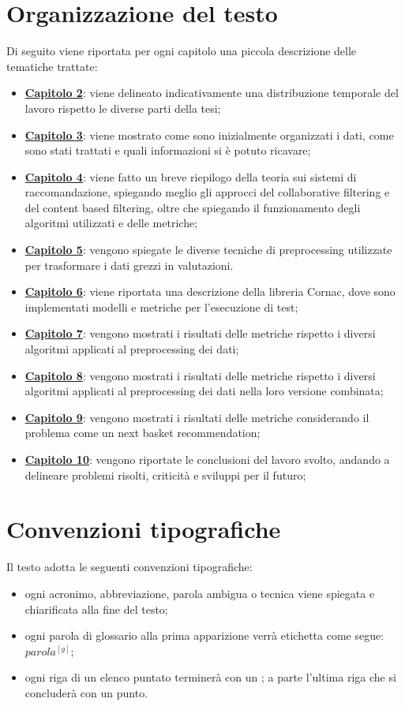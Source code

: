 \section{Organizzazione del testo}
Di seguito viene riportata per ogni capitolo una piccola descrizione delle tematiche trattate:
\begin{itemize}
	\item \hyperlink{(chap:capitolo2)}{\textbf{Capitolo 2}}: viene delineato indicativamente una distribuzione temporale del lavoro rispetto le diverse parti della tesi;
	\item \hyperlink{(chap:capitolo3)}{\textbf{Capitolo 3}}: viene mostrato come sono inizialmente organizzati i dati, come sono stati trattati e quali informazioni si è potuto ricavare;
	\item \hyperlink{(chap:capitolo4)}{\textbf{Capitolo 4}}: viene fatto un breve riepilogo della teoria sui sistemi di raccomandazione, spiegando meglio gli approcci del collaborative filtering e del content based filtering, oltre che spiegando il funzionamento degli algoritmi utilizzati e delle metriche;
	\item \hyperlink{(chap:capitolo5)}{\textbf{Capitolo 5}}: vengono spiegate le diverse tecniche di preprocessing utilizzate per trasformare i dati grezzi in valutazioni.
	\item \hyperlink{(chap:capitolo6)}{\textbf{Capitolo 6}}: viene riportata una descrizione della libreria Cornac, dove sono implementati modelli e metriche per l'esecuzione di test;
	\item \hyperlink{(chap:capitolo7)}{\textbf{Capitolo 7}}: vengono mostrati i risultati delle metriche rispetto i diversi algoritmi applicati al preprocessing dei dati;
	\item \hyperlink{(chap:capitolo8)}{\textbf{Capitolo 8}}: vengono mostrati i risultati delle metriche rispetto i diversi algoritmi applicati al preprocessing dei dati nella loro versione combinata;
	\item \hyperlink{(chap:capitolo9)}{\textbf{Capitolo 9}}: vengono mostrati i risultati delle metriche considerando il problema come un next basket recommendation;
	\item \hyperlink{(chap:capitolo10)}{\textbf{Capitolo 10}}: vengono riportate le conclusioni del lavoro svolto, andando a delineare problemi risolti, criticità e sviluppi per il futuro;
\end{itemize}
\section{Convenzioni tipografiche}
Il testo adotta le seguenti convenzioni tipografiche:
\begin{itemize}
	\item ogni acronimo, abbreviazione, parola ambigua o tecnica viene spiegata e chiarificata alla fine del testo;
	\item ogni parola di glossario alla prima apparizione verrà etichetta come segue: $parola^{[g]}$;
	\item ogni riga di un elenco puntato terminerà con un ; a parte l'ultima riga che si concluderà con un punto.
\end{itemize}